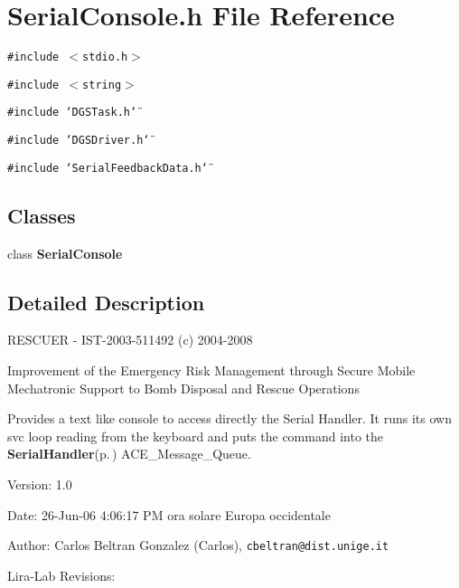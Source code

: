 \section{Serial\-Console.h File Reference}
\label{SerialConsole_8h}
{\tt \#include $<$stdio.h$>$}\par
{\tt \#include $<$string$>$}\par
{\tt \#include \char`\"{}DGSTask.h\char`\"{}}\par
{\tt \#include \char`\"{}DGSDriver.h\char`\"{}}\par
{\tt \#include \char`\"{}Serial\-Feedback\-Data.h\char`\"{}}\par
\subsection*{Classes}
\begin{CompactItemize}
\item 
class {\bf Serial\-Console}
\end{CompactItemize}


\subsection{Detailed Description}
RESCUER - IST-2003-511492 (c) 2004-2008

Improvement of the Emergency Risk Management through Secure Mobile Mechatronic Support to Bomb Disposal and Rescue Operations

Provides a text like console to access directly the Serial Handler. It runs its own svc loop reading from the keyboard and puts the command into the {\bf Serial\-Handler}{\rm (p.\,\pageref{classSerialHandler})} ACE\_\-Message\_\-Queue. \begin{Desc}
\item[Version:]1.0 \end{Desc}
\begin{Desc}
\item[Date:]26-Jun-06 4:06:17 PM ora solare Europa occidentale \end{Desc}
\begin{Desc}
\item[Author:]Carlos Beltran Gonzalez (Carlos), {\tt cbeltran@dist.unige.it} 

Lira-Lab Revisions:\end{Desc}

